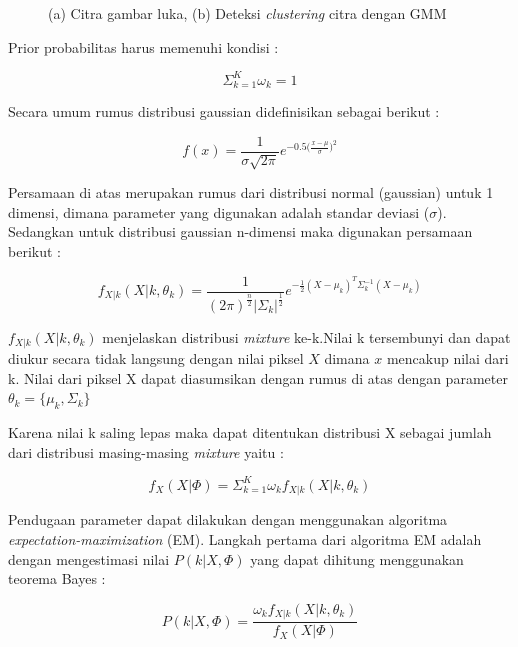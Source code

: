 \begin{figure}[H]
\begin{subfigure}{0.4\textwidth}
		\caption{}
	  \end{subfigure} 
	\caption{
		(a) Citra gambar luka, (b) Deteksi \emph{clustering} citra dengan GMM
	 }
  \end{figure}

Prior probabilitas harus memenuhi kondisi :

\begin{equation} \label{}
	\Sigma^K_{k=1} \omega_k = 1
\end{equation}

Secara umum rumus distribusi gaussian didefinisikan sebagai berikut :

\begin{equation} \label{}
f(x) = \frac{1}{\sigma \sqrt{2\pi}} e^{-0.5 \bigl(\frac{x - \mu}{\sigma} \bigr)^2}
\end{equation}

Persamaan di atas merupakan rumus dari distribusi normal (gaussian) untuk 1 dimensi, 
dimana parameter yang digunakan adalah standar deviasi (\(\sigma\)). Sedangkan 
untuk distribusi gaussian n-dimensi maka digunakan persamaan berikut :


\begin{equation} \label{}
	f_{X|k} (X|k, \theta_k) = \frac{1}{(2\pi)^\frac{n}{2} |\Sigma_k|^\frac{1}{2}} e^{-\frac{1}{2} (X - \mu_k)^T \Sigma^{-1}_k (X - \mu_k)}
\end{equation}

\(f_{X|k} (X|k, \theta_k)\) menjelaskan distribusi \emph{mixture} ke-k.Nilai k 
tersembunyi dan dapat diukur secara tidak langsung dengan nilai piksel \(X\) 
dimana \(x\) mencakup nilai dari k. Nilai dari piksel X dapat diasumsikan dengan 
rumus di atas dengan parameter \(\theta_k = \{ \mu_k, \Sigma_k \}\)

Karena nilai k saling lepas maka dapat ditentukan distribusi X sebagai jumlah dari
distribusi masing-masing \emph{mixture} yaitu :

\begin{equation} \label{}
	f_{X}(X|\Phi) = \Sigma_{k=1}^K \omega_k f_{X|k} (X|k,\theta_k)
\end{equation}

Pendugaan parameter dapat dilakukan dengan menggunakan algoritma \emph{expectation-maximization} (EM).
Langkah pertama dari algoritma EM adalah dengan mengestimasi nilai \(P(k|X,\Phi)\) 
yang dapat dihitung menggunakan teorema Bayes :

\begin{equation} \label{}
	P(k|X,\Phi) = \frac{\omega_k f_{X|k} (X|k,\theta_k)}{f_X(X|\Phi)}
\end{equation}

